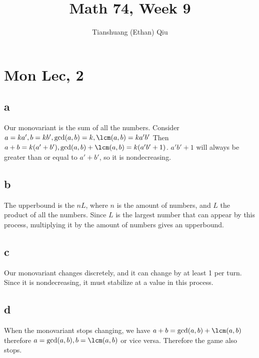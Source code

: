 \documentclass[12pt]{article}
\author{Tianshuang (Ethan) Qiu}
\begin{document}
\title{Math 74, Week 9}
\maketitle

\section{Mon Lec, 2}

\subsection{a}
Our monovariant is the sum of all the numbers. Consider $a = ka', b = kb', \gcd(a,b) = k, \lcm(a,b) = ka'b'$ Then $a+b = k(a'+b'), \gcd(a,b) +\lcm(a,b) = k(a'b'+1)$. $a'b' + 1$ will always be greater than or equal to $a' + b'$, so it is nondecreasing.

\subsection{b}
The upperbound is the $nL$, where $n$ is the amount of numbers, and $L$ the product of all the numbers. Since $L$ is the largest number that can appear by this process, multiplying it by the amount of numbers gives an upperbound.

\subsection{c}
Our monovariant changes discretely, and it can change by at least 1 per turn. Since it is nondecreasing, it must stabilize at a value in this process.

\subsection{d}
When the monovariant stops changing, we have $a+b = \gcd(a,b) +\lcm(a,b)$ therefore $a = \gcd(a,b), b = \lcm(a,b)$ or vice versa. Therefore the game also stops.
\end{document}
